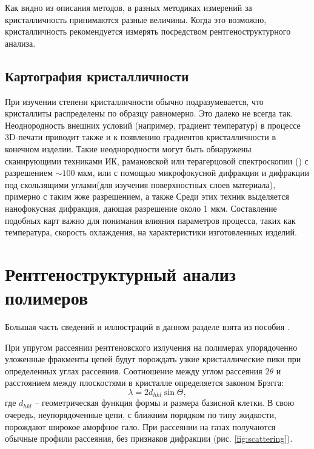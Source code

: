 Как видно из описания методов, в разных методиках измерений за кристалличность принимаются разные величины. Когда это возможно, кристалличность рекомендуется измерять посредством рентгеноструктурного анализа. 


\subsection{Картография кристалличности}
При изучении степени кристалличности обычно подразумевается, что кристаллиты распределены по образцу равномерно. Это далеко не всегда так. Неоднородность внешних условий (например, градиент температур) в процессе 3D-печати приводит также и к появлению градиентов кристалличности в конечном изделии. 
Такие неоднородности могут быть обнаружены сканирующими техниками ИК, рамановской или терагерцовой спектроскопии (\cite{thz})  с разрешением $\sim 100$ мкм, или с помощью микрофокусной дифракции и дифракции под скользящими углами(для изучения поверхностных слоев материала), примерно с таким жже разрешением, а также  Среди этих техник выделяется нанофокусная дифракция, дающая разрешение около 1 мкм.
Составление подобных карт важно для понимания влияния параметров процесса, таких как температура, скорость охлаждения, на характеристики изготовленных изделий.



\section{Рентгеноструктурный анализ полимеров}
Большая часть сведений и иллюстраций в данном разделе взята из пособия \cite{2d-diff}.

При упругом рассеянии рентгеновского излучения на полимерах упорядоченно уложенные фракменты цепей будут порождать узкие кристаллические пики при определенных углах рассеяния. 
Соотношение между углом рассеяния $2\theta$ и расстоянием между плоскостями в кристалле определяется законом Брэгга:
\[
\lambda = 2d_{hkl} \sin \Theta,
\]
где $d_{hkl}$ -- геометрическая функция формы и размера базисной клетки.
В свою очередь, неупорядоченные цепи, с ближним порядком по типу жидкости, порождают широкое аморфное гало. При рассеянии на газах получаются обычные профили рассеяния, без признаков дифракции (рис. \ref{fig:scattering}).


